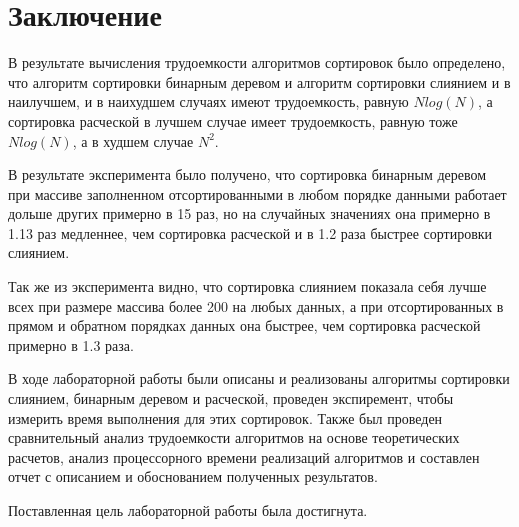\chapter*{Заключение}

В результате вычисления трудоемкости алгоритмов сортировок было определено, что алгоритм сортировки бинарным деревом и алгоритм сортировки слиянием и в наилучшем, и в наихудшем случаях имеют трудоемкость, равную $Nlog(N)$, а сортировка расческой в лучшем случае имеет трудоемкость, равную тоже $Nlog(N)$, а в худшем случае $N^2$.

В результате эксперимента было получено, что сортировка бинарным деревом при массиве заполненном отсортированными в любом порядке данными работает дольше других примерно в 15 раз, но на случайных значениях она примерно в 1.13 раз медленнее, чем сортировка расческой и в 1.2 раза быстрее сортировки слиянием.

Так же из эксперимента видно, что сортировка слиянием показала себя лучше всех при размере массива более 200 на любых данных, а при отсортированных в прямом и обратном порядках данных она быстрее, чем сортировка расческой примерно в 1.3 раза.

В ходе лабораторной работы были описаны и реализованы алгоритмы сортировки слиянием, бинарным деревом и расческой, проведен экспиремент, чтобы измерить время выполнения для этих сортировок. Также был проведен сравнительный анализ трудоемкости алгоритмов на основе теоретических расчетов, анализ процессорного времени реализаций алгоритмов и составлен отчет с описанием и обоснованием полученных результатов.

Поставленная цель лабораторной работы была достигнута.